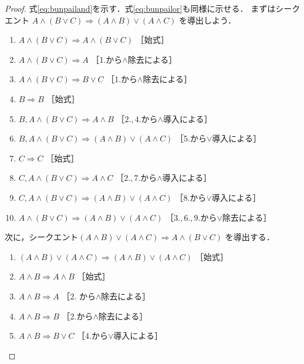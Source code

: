    \begin{proof}
     式\eqref{eq:bunpailand}を示す．式\eqref{eq:bunpailor}も同様に示せる．
     まずはシークエント
     $A \land (B \lor C) \Longrightarrow (A \land B) \lor (A \land C)$
     を導出しよう．
     \begin{enumerate}[1. ]
       \item $A \land ( B \lor C ) \Longrightarrow A \land ( B \lor C) $
              \quad ［始式］
       \item $A \land ( B \lor C ) \Longrightarrow A$ \quad ［1.から$\land$除去による］
       \item $A \land ( B \lor C) \Longrightarrow B \lor C $ \quad ［1.から$\land$除去による］
       \item $B \Longrightarrow B$ \quad ［始式］
       \item $B,  A \land ( B \lor C ) \Longrightarrow A \land B$ 
              \quad ［$2., 4.$から$\land$導入による］
       \item $B,  A \land ( B \lor C) \Longrightarrow ( A \land B) \lor ( A \land C)$
              \quad ［5.から$\lor$導入による］
       \item $C \Longrightarrow C$ \quad ［始式］
       \item $C,  A \land ( B \lor C ) \Longrightarrow A \land C$
              \quad ［$2., 7.$から$\land$導入による］
       \item $C,  A \land ( B \lor C ) \Longrightarrow ( A \land B ) \lor (A \land C)$
              \quad ［8.から$\lor$導入による］
       \item $A \land ( B \lor C) \Longrightarrow (A \land B) \lor (A \land C)$
              \quad ［$3., 6., 9.$から$\lor$除去による］
     \end{enumerate} 
     次に，シークエント$( A \land B ) \lor ( A \land C) \Longrightarrow A \land ( B \lor C)$
     を導出する．
     \begin{enumerate}[1. ]
       \item $(A \land B) \lor ( A \land C) \Longrightarrow (A \land B) \lor (A \land C)$
              \quad ［始式］
       \item $A \land B \Longrightarrow A \land B$ \quad ［始式］
       \item $A \land B \Longrightarrow A $ \quad ［2. から$\land$除去による］
       \item $A \land B \Longrightarrow B$ \quad ［2.から$\land$除去による］
       \item $A \land B \Longrightarrow B \lor C$ \quad ［4.から$\lor$導入による］

\end{enumerate}
\end{proof}
